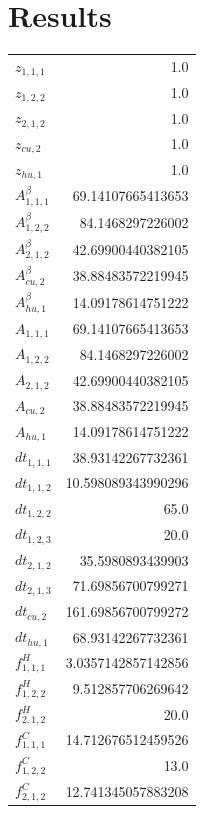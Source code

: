 \documentclass{article}%
\makeatletter
\let\mcnewpage=\newpage%
\newcommand{\TrickSupertabularIntoMulticols}{%
\renewcommand\newpage{%
\if@firstcolumn%
\hrule width\linewidth height0pt%
\columnbreak%
\else%
\mcnewpage%
\fi%
}%
}%
\makeatother
\begin{document}
\section{Results}%
\thispagestyle{plain}%
\begin{multicols*}{3}%
\TrickSupertabularIntoMulticols%
%
\begin{supertabular}{lr}%
	$z_{1,1,1}$ & 1.0 \\%
	$z_{1,2,2}$ & 1.0 \\%
	$z_{2,1,2}$ & 1.0 \\%
	$z_{cu,2}$ & 1.0 \\%
	$z_{hu,1}$ & 1.0 \\%
	$A_{1,1,1}^{\beta}$ & 69.14107665413653 \\%
	$A_{1,2,2}^{\beta}$ & 84.1468297226002 \\%
	$A_{2,1,2}^{\beta}$ & 42.69900440382105 \\%
	$A_{cu,2}^{\beta}$ & 38.88483572219945 \\%
	$A_{hu,1}^{\beta}$ & 14.09178614751222 \\%
	$A_{1,1,1}$ & 69.14107665413653 \\%
	$A_{1,2,2}$ & 84.1468297226002 \\%
	$A_{2,1,2}$ & 42.69900440382105 \\%
	$A_{cu,2}$ & 38.88483572219945 \\%
	$A_{hu,1}$ & 14.09178614751222 \\%
	$dt_{1,1,1}$ & 38.93142267732361 \\%
	$dt_{1,1,2}$ & 10.598089343990296 \\%
	$dt_{1,2,2}$ & 65.0 \\%
	$dt_{1,2,3}$ & 20.0 \\%
	$dt_{2,1,2}$ & 35.5980893439903 \\%
	$dt_{2,1,3}$ & 71.69856700799271 \\%
	$dt_{cu,2}$ & 161.69856700799272 \\%
	$dt_{hu,1}$ & 68.93142267732361 \\%
	$f_{1,1,1}^{H}$ & 3.0357142857142856 \\%
	$f_{1,2,2}^{H}$ & 9.512857706269642 \\%
	$f_{2,1,2}^{H}$ & 20.0 \\%
	$f_{1,1,1}^{C}$ & 14.712676512459526 \\%
	$f_{1,2,2}^{C}$ & 13.0 \\%
	$f_{2,1,2}^{C}$ & 12.741345057883208 \\%

\end{supertabular}
\end{multicols*}
\end{document}

